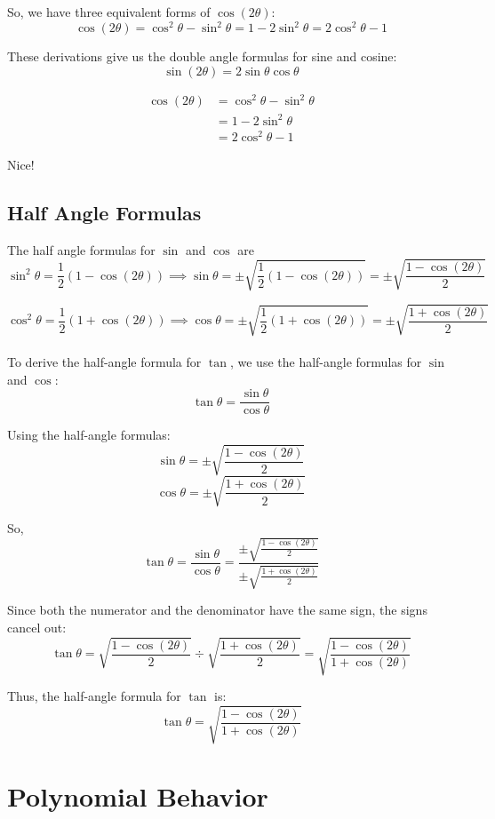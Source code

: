 \documentclass[12pt]{article}
\begin{document}
So, we have three equivalent forms of \(\cos(2\theta)\):
\[
\cos(2\theta) = \cos^2 \theta - \sin^2 \theta = 1 - 2 \sin^2 \theta = 2 \cos^2 \theta - 1
\]

These derivations give us the double angle formulas for sine and cosine:
\[
\sin(2\theta) = 2 \sin \theta \cos \theta
\]

\begin{align*}
\cos(2\theta) &= \cos^2 \theta - \sin^2 \theta \\
  &= 1 - 2 \sin^2 \theta \\
  &= 2 \cos^2 \theta - 1
\end{align*}


Nice!

\subsection{Half Angle Formulas}

The half angle formulas for \(\sin\) and \(\cos\) are\\
  
\[
\sin^2\theta = \frac{1}{2}(1 - \cos(2\theta)) \implies \sin\theta = \pm \sqrt{\frac{1}{2}\left(1 - \cos(2\theta)\right)} = \pm \sqrt{\frac{1 - \cos(2\theta)}{2}}
\]

\[
\cos^2\theta = \frac{1}{2}(1 + \cos(2\theta)) \implies \cos\theta = \pm \sqrt{\frac{1}{2}\left(1 + \cos(2\theta)\right)} = \pm \sqrt{\frac{1 + \cos(2\theta)}{2}}
\]\\

To derive the half-angle formula for \(\tan\), we use the half-angle formulas for \(\sin\) and \(\cos\):
\[
\tan \theta = \frac{\sin \theta}{\cos \theta}
\]

Using the half-angle formulas:
\[
\sin \theta = \pm \sqrt{\frac{1 - \cos(2\theta)}{2}}
\]
\[
\cos \theta = \pm \sqrt{\frac{1 + \cos(2\theta)}{2}}
\]

So,
\[
\tan \theta = \frac{\sin \theta}{\cos \theta} = \frac{\pm \sqrt{\frac{1 - \cos(2\theta)}{2}}}{\pm \sqrt{\frac{1 + \cos(2\theta)}{2}}}
\]

Since both the numerator and the denominator have the same sign, the signs cancel out:
\[
\tan \theta = \sqrt{\frac{1 - \cos(2\theta)}{2}} \div \sqrt{\frac{1 + \cos(2\theta)}{2}} = \sqrt{\frac{1 - \cos(2\theta)}{1 + \cos(2\theta)}}
\]

Thus, the half-angle formula for \(\tan\) is:
\[
\tan \theta = \sqrt{\frac{1 - \cos(2\theta)}{1 + \cos(2\theta)}}
\]

\section{Polynomial Behavior}
\end{document}
